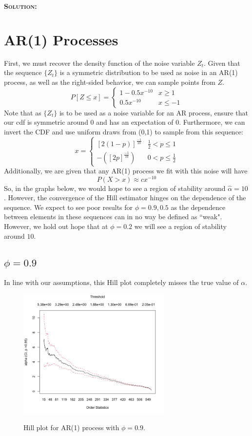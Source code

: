 \documentclass[12pt,oneside]{article}
\newenvironment{solution}
    {\textbf{\textsc{Solution:}}\\}
    {\newpage}
\begin{document}
\begin{solution}
\section{AR(1) Processes}
First, we must recover the density function of the noise variable $Z_t$. Given that the sequence $\{Z_t\}$ is a symmetric distribution to be used as noise in an AR(1) process, as well as the right-sided behavior, we can sample points from $Z$.
\[P[Z\leq x] =\begin{cases} 1-0.5x^{-10} & x \geq 1 \\
0.5x^{-10} & x \leq -1 \end{cases}\]
Note that as $\{Z_t\}$ is to be used as a noise variable for an AR process, ensure that our cdf is symmetric around 0 and has an expectation of 0. Furthermore, we can invert the CDF and use uniform draws from (0,1) to sample from this sequence:
\[x=\begin{cases} [2(1-p)]^{\frac{-1}{10}} & \frac{1}{2}< p\leq 1\\
-([2p]^{\frac{-1}{10}}) & 0<p\leq \frac{1}{2}\end{cases}\]
Additionally, we are given that any AR(1) process we fit with this noise will have
\[P(X>x)\approx cx^{-10}\]
So, in the graphs below, we would hope to see a region of stability around $\hat{\alpha}=10$. However, the convergence of the Hill estimator hinges on the dependence of the sequence. We expect to see poor results for $\phi=0.9,0.5$ as the dependence between elements in these sequences can in no way be defined as ``weak". However, we hold out hope that at $\phi=0.2$ we will see a region of stability around $10$.
\subsection*{$\phi=0.9$}
In line with our assumptions, this Hill plot completely misses the true value of $\alpha$. 
\begin{figure}[H]
\begin{center}
{\includegraphics[width=3in]{Assignments/a3/hill-plot-ar9.png}}
\caption{Hill plot for AR(1) process with $\phi=0.9$.}
\end{center}
\end{figure}


\end{solution}
\end{document}
